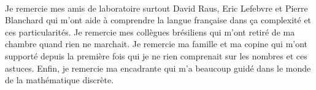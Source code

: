 \thispagestyle{empty}
\vspace*{\fill}
{\\[0.2cm]

	\begin{minipage}[c]{\textwidth}
	\center
       Je remercie mes amis de laboratoire surtout David Raus, Eric Lefebvre et Pierre Blanchard qui m'ont aide à comprendre la langue française dans
	ça complexité et ces particularités. Je remercie mes collègues brésiliens qui m'ont retiré de ma chambre quand rien ne marchait. 
	Je remercie ma famille et ma copine qui m'ont supporté depuis la première fois qui je ne rien comprenait sur 
	les nombres et ces astuces. Enfin, je remercie ma encadrante qui m'a beaucoup guidé dans le monde de la mathématique discrète.
      \end{minipage}
}
\vspace*{\fill}
\newpage

